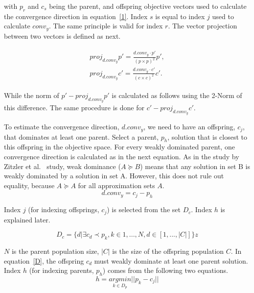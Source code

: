 with $p_r$ and $c_s$ being the parent, and offspring objective vectors used to calculate the convergence direction in equation~\ref{1}. Index $s$ is equal to index $j$ used to calculate $conv_{y}$. The same principle is valid for index $r$. The vector projection between two vectors is defined as next.

\begin{align}
\begin{split}
proj_{d.conv_{y}}p \prime = \frac {{d.conv_{y}} \cdot {p \prime}} {(p \times p)^2}{{p \prime}},\\
proj_{d.conv_{y}}c \prime = \frac {{d.conv_{y}} \cdot {c \prime}} {(c \times c)^2}{{c \prime}}.
\end{split}
\end{align}

While the norm of $p \prime - proj_{d.conv_{y}}p \prime$ is calculated as follows using the 2-Norm of this difference. The same procedure is done for $c \prime - proj_{d.conv_{y}}c \prime$.

To estimate the convergence direction, $d.conv_{y}$, we need to have an offspring, $c_j$, that dominates at least one parent. Select a parent, $p_h$, solution that is closest to this offspring in the objective space.  For every weakly dominated parent, one convergence direction is calculated as in the next equation. As in the study by Zitzler et al.~\cite{zitzler2003performance} study, weak dominance ($A \succeq B$) means that any solution in set B is weakly dominated by a solution in set A. However, this does not rule out equality, because $A \succeq A$ for all approximation sets $A$.
\begin{equation}
\label{1}
d.conv_{y} = c_j - p_h
\end{equation}

Index $j$ (for indexing offsprings, $c_j$) is selected from the set $D_c$. Index $h$ is explained later.

\vspace{-1em}
\begin{equation}
\label{D}
D_c = \{d| \exists c_d \prec p_k, k \in {1,..., N}, d \in [1,..., |C|]\}
z\end{equation}

$N$ is the parent population size, $|C|$ is the size of the offspring population $C$. In equation~\ref{D}, the offspring $c_d$ must weakly dominate at least one parent solution. Index $h$ (for indexing parents, $p_h$) comes from the following two equations.
\begin{equation}
h = \underset{k \in D_p }{argmin} || p_k - c_j ||
\end{equation}

